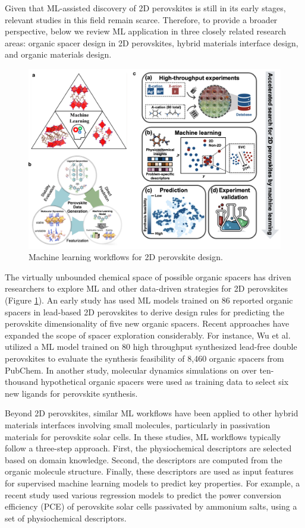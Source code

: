 Given that ML-assisted discovery of 2D perovskites is still in its early stages, relevant studies in this field remain scarce. Therefore, to provide a broader perspective, below we review ML application in three closely related research areas: organic spacer design in 2D perovskites, hybrid materials interface design, and organic materials design. 

\begin{figure}[ht]
    \centering
    \includegraphics[width=\textwidth]{figures/literature-review/figure2-16.png}
    \caption{Machine learning workflows for 2D perovskite design\cite{RN283,RN12, RN315}.}
    \label{fig:figure2.16}
\end{figure}

The virtually unbounded chemical space of possible organic spacers has driven researchers to explore ML and other data-driven strategies for 2D perovskites (Figure \ref{fig:figure2.16}). An early study has used ML models trained on 86 reported organic spacers in lead-based 2D perovskites to derive design rules for predicting the perovskite dimensionality of five new organic spacers\cite{RN12}. Recent approaches have expanded the scope of spacer exploration considerably. For instance, Wu et al. utilized a ML model trained on 80 high throughput synthesized lead-free double perovskites to evaluate the synthesis feasibility of 8,460 organic spacers from PubChem\cite{RN315}. In another study, molecular dynamics simulations on over ten-thousand hypothetical organic spacers were used as training data to select six new ligands for perovskite synthesis\cite{RN283}. 


Beyond 2D perovskites, similar ML workflows have been applied to other hybrid materials interfaces involving small molecules, particularly in passivation materials for perovskite solar cells\cite{RN13,RN538,RN630}. In these studies, ML workflows typically follow a three-step approach. First, the physiochemical descriptors are selected based on domain knowledge. Second, the descriptors are computed from the organic molecule structure. Finally, these descriptors are used as input features for supervised machine learning models to predict key properties. For example, a recent study used various regression models to predict the power conversion efficiency (PCE) of perovskite solar cells passivated by ammonium salts, using a set of physiochemical descriptors\cite{RN538}. 

